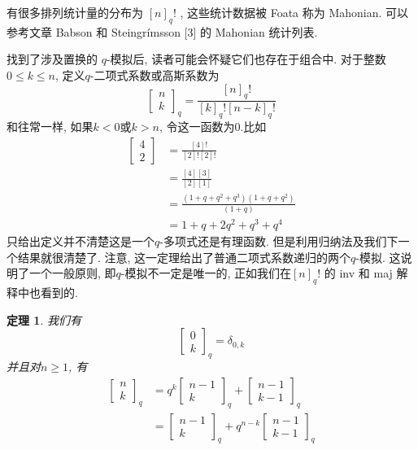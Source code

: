 \documentclass[a4paper,12pt]{ctexbook}
\newtheorem{theorem}[lemma]{\hspace{2em}定理}%
\begin{document}
有很多排列统计量的分布为 $[n]_{q} !$ , 这些统计数据被 Foata 称为 Mahonian. 可以参考文章
Babson 和 Steingrímsson [3] 的 Mahonian 统计列表.

找到了涉及置换的 $q$-模拟后, 读者可能会怀疑它们也存在于组合中. 对于整数$0 \leq k \leq n$, 定义{\kaishu $q$-二项式系数}或{\kaishu 高斯系数}为
$$
\left[\begin{array}{l}
n \\
k
\end{array}\right]_{q}=\frac{[n]_{q} !}{[k]_{q} ![n-k]_{q} !}
$$
和往常一样, 如果$k<0$或$k>n$, 令这一函数为0.比如
\[
\begin{aligned}
\left[\begin{array}{l}
4 \\
2
\end{array}\right] &=\frac{[4] !}{[2] ![2] !} \\
&=\frac{[4][3]}{[2][1]} \\
&=\frac{\left(1+q+q^{2}+q^{3}\right)\left(1+q+q^{2}\right)}{(1+q)} \\
&=1+q+2 q^{2}+q^{3}+q^{4}
\end{aligned}\tag{3.5}
\]
只给出定义并不清楚这是一个$q$-多项式还是有理函数. 但是利用归纳法及我们下一个结果就很清楚了. 注意, 这一定理给出了普通二项式系数递归的两个$q$-模拟. 这说明了一个一般原则, 即$q$-模拟不一定是唯一的, 正如我们在$[n]_{q} !$ 的 inv 和 maj 解释中也看到的.
\begin{theorem}
	我们有$$
	\left[\begin{array}{l}
	0 \\
	k
	\end{array}\right]_{q}=\delta_{0, k}
	$$
并且对$n \geq 1$, 有
$$
\begin{aligned}
\left[\begin{array}{l}
n \\
k
\end{array}\right]_{q} &=q^{k}\left[\begin{array}{c}
n-1 \\
k
\end{array}\right]_{q}+\left[\begin{array}{c}
n-1 \\
k-1
\end{array}\right]_{q} \\
&=\left[\begin{array}{c}
n-1 \\
k
\end{array}\right]_{q}+q^{n-k}\left[\begin{array}{c}
n-1 \\
k-1
\end{array}\right]_{q}
\end{aligned}
$$
\end{theorem}
\end{document}
